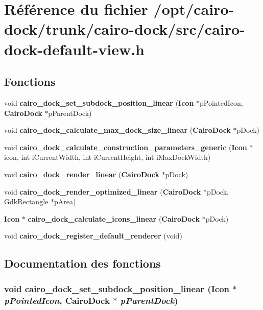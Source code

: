 \section{Référence du fichier /opt/cairo-dock/trunk/cairo-dock/src/cairo-dock-default-view.h}
\label{cairo-dock-default-view_8h}
\subsection*{Fonctions}
\begin{CompactItemize}
\item 
void {\bf cairo\_\-dock\_\-set\_\-subdock\_\-position\_\-linear} ({\bf Icon} $\ast$pPointedIcon, {\bf CairoDock} $\ast$pParentDock)
\item 
void {\bf cairo\_\-dock\_\-calculate\_\-max\_\-dock\_\-size\_\-linear} ({\bf CairoDock} $\ast$pDock)
\item 
void {\bf cairo\_\-dock\_\-calculate\_\-construction\_\-parameters\_\-generic} ({\bf Icon} $\ast$icon, int iCurrentWidth, int iCurrentHeight, int iMaxDockWidth)
\item 
void {\bf cairo\_\-dock\_\-render\_\-linear} ({\bf CairoDock} $\ast$pDock)
\item 
void {\bf cairo\_\-dock\_\-render\_\-optimized\_\-linear} ({\bf CairoDock} $\ast$pDock, GdkRectangle $\ast$pArea)
\item 
{\bf Icon} $\ast$ {\bf cairo\_\-dock\_\-calculate\_\-icons\_\-linear} ({\bf CairoDock} $\ast$pDock)
\item 
void {\bf cairo\_\-dock\_\-register\_\-default\_\-renderer} (void)
\end{CompactItemize}


\subsection{Documentation des fonctions}
\subsubsection{\setlength{\rightskip}{0pt plus 5cm}void cairo\_\-dock\_\-set\_\-subdock\_\-position\_\-linear ({\bf Icon} $\ast$ {\em pPointedIcon}, {\bf CairoDock} $\ast$ {\em pParentDock})}\label{cairo-dock-default-view_8h_674e4028e3f428bbd517d6d4b3151e96}


